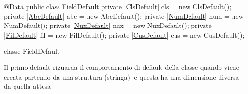 \documentclass[a4paper,10pt]{report}
\newif\ifesource
\newenvironment{elisting}[1][!htb]
  {\captionsetup{aboveskip=0pt}\begin{listing}[#1]}
  {\end{listing}%
}
\begin{document}
\ifesource
\begin{figure*}[!htb]
\begin{lstlisting}[language=java, caption=classe FieldDefault, 
label=lst:FieldDefault]
@Data
public class FieldDefault {
    private (*\hyperref[lst:ClsDefault]{ClsDefault}*) cls = new ClsDefault();
    private (*\hyperref[lst:AbcDefault]{AbcDefault}*) abc = new AbcDefault();
    private (*\hyperref[lst:NumDefault]{NumDefault}*) num = new NumDefault();
    private (*\hyperref[lst:NuxDefault]{NuxDefault}*) nux = new NuxDefault();
    private (*\hyperref[lst:FilDefault]{FilDefault}*) fil = new FilDefault();
    private (*\hyperref[lst:CusDefault]{CusDefault}*) cus = new CusDefault();
}
\end{lstlisting}\index{FieldDefault}
\end{figure*}
\else
\begin{elisting}
\begin{javacode}
@Data
public class FieldDefault {
    private |\hyperref[lst:ClsDefault]{ClsDefault}| cls = new ClsDefault();
    private |\hyperref[lst:AbcDefault]{AbcDefault}| abc = new AbcDefault();
    private |\hyperref[lst:NumDefault]{NumDefault}| num = new NumDefault();
    private |\hyperref[lst:NuxDefault]{NuxDefault}| nux = new NuxDefault();
    private |\hyperref[lst:FilDefault]{FilDefault}| fil = new FilDefault();
    private |\hyperref[lst:CusDefault]{CusDefault}| cus = new CusDefault();
}
\end{javacode}
\caption{classe FieldDefault}
\label{lst:FieldDefault}
\end{elisting}
\fi
Il primo default riguarda il comportamento di default della classe quando viene 
creata partendo da una struttura (stringa), e questa ha una dimensione diversa 
da quella attesa
\end{document}
